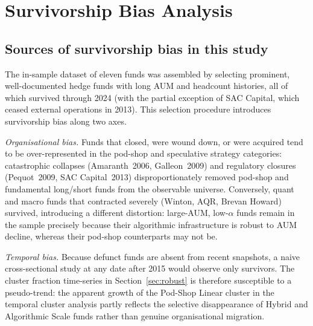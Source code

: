 
\FloatBarrier

\section{\label{sec:survivorship}Survivorship Bias Analysis}

\subsection{Sources of survivorship bias in this study}

The in-sample dataset of eleven funds was assembled by selecting
prominent, well-documented hedge funds with long AUM and headcount
histories, all of which survived through 2024 (with the partial
exception of SAC Capital, which ceased external operations in 2013).
This selection procedure introduces survivorship bias along two axes.

\textit{Organisational bias.}
Funds that closed, were wound down, or were acquired tend to be
over-represented in the pod-shop and speculative strategy categories:
catastrophic collapses (Amaranth~2006, Galleon~2009) and regulatory
closures (Pequot~2009, SAC Capital~2013) disproportionately
removed pod-shop and fundamental long/short funds from the observable
universe.
Conversely, quant and macro funds that contracted severely
(Winton, AQR, Brevan Howard) survived, introducing a
different distortion: large-AUM, low-$\alpha$ funds remain in the
sample precisely because their algorithmic infrastructure is robust
to AUM decline, whereas their pod-shop counterparts may not be.

\textit{Temporal bias.}
Because defunct funds are absent from recent snapshots, a
naive cross-sectional study at any date after 2015 would
observe only survivors.
The cluster fraction time-series in Section~\ref{sec:robust}
is therefore susceptible to a pseudo-trend: the apparent growth
of the Pod-Shop Linear cluster in the temporal cluster analysis
partly reflects the selective disappearance of Hybrid and Algorithmic
Scale funds rather than genuine organisational migration.

